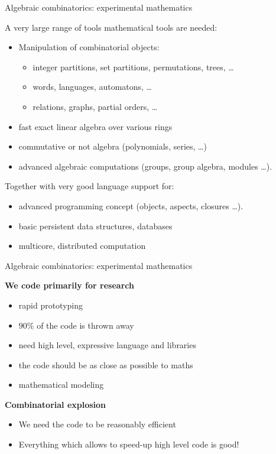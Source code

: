 \documentclass[compress,11pt]{beamer}
\begin{document}
\begin{frame}{Algebraic combinatorics: experimental mathematics}

A very large range of tools mathematical tools are needed:
\begin{itemize}
\item Manipulation of combinatorial objects:
  \begin{itemize}
  \item integer partitions, set partitions, permutations, trees, \dots
  \item words, languages, automatons, \dots
  \item relations, graphs, partial orders, \dots
  \end{itemize}
\item fast exact linear algebra over various rings
\item commutative or not algebra (polynomials, series, \dots)
\item advanced algebraic computations (groups, group algebra, modules \dots).
\end{itemize}
\bigskip\pause

Together with very good language support for:
\begin{itemize}
\item advanced programming concept (objects, aspects, closures \dots).
\item basic persistent data structures, databases
\item multicore, distributed computation
\end{itemize}
\end{frame}

\begin{frame}{Algebraic combinatorics: experimental mathematics}

\textbf{\Large We code primarily for research}
\begin{itemize}
\item rapid prototyping
\item $90\%$ of the code is thrown away
\bigskip\pause
\item need high level, expressive language and libraries
\item the code should be as close as possible to maths
\item mathematical modeling
\end{itemize}
\bigskip\pause
\textbf{\Large Combinatorial explosion}
\begin{itemize}
\item We need the code to be reasonably efficient
\item Everything which allows to speed-up high level code is good!
\end{itemize}
\end{frame}
\end{document}
